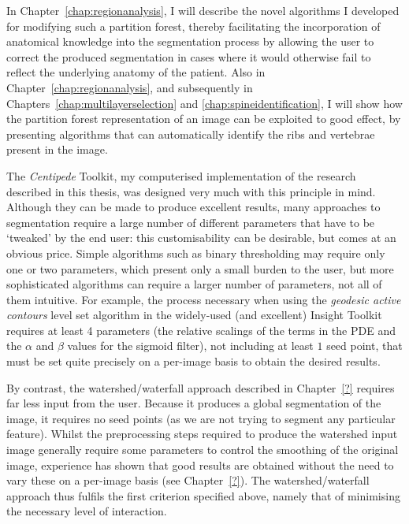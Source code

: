 In Chapter~\ref{chap:regionanalysis}, I will describe the novel algorithms I developed for modifying such a partition forest, thereby facilitating the incorporation of anatomical knowledge into the segmentation process by allowing the user to correct the produced segmentation in cases where it would otherwise fail to reflect the underlying anatomy of the patient. Also in Chapter~\ref{chap:regionanalysis}, and subsequently in Chapters~\ref{chap:multilayerselection} and \ref{chap:spineidentification}, I will show how the partition forest representation of an image can be exploited to good effect, by presenting algorithms that can automatically identify the ribs and vertebrae present in the image.

\iffalse

The \emph{Centipede} Toolkit, my computerised implementation of the research described in this thesis, was designed very much with this principle in mind. Although they can be made to produce excellent results, many approaches to segmentation require a large number of different parameters that have to be `tweaked' by the end user: this customisability can be desirable, but comes at an obvious price. Simple algorithms such as binary thresholding may require only one or two parameters, which present only a small burden to the user, but more sophisticated algorithms can require a larger number of parameters, not all of them intuitive. For example, the process necessary when using the \emph{geodesic active contours} level set algorithm in the widely-used (and excellent) Insight Toolkit \cite{?} requires at least 4 parameters (the relative scalings of the terms in the PDE  and the $\alpha$ and $\beta$ values for the sigmoid filter), not including at least $1$ seed point, that must be set quite precisely on a per-image basis to obtain the desired results.

By contrast, the watershed/waterfall approach \cite{?} described in Chapter~\ref{?} requires far less input from the user. Because it produces a global segmentation of the image, it requires no seed points (as we are not trying to segment any particular feature). Whilst the preprocessing steps required to produce the watershed input image generally require some parameters to control the smoothing of the original image, experience has shown that good results are obtained without the need to vary these on a per-image basis (see Chapter~\ref{?}). The watershed/waterfall approach thus fulfils the first criterion specified above, namely that of minimising the necessary level of interaction.

